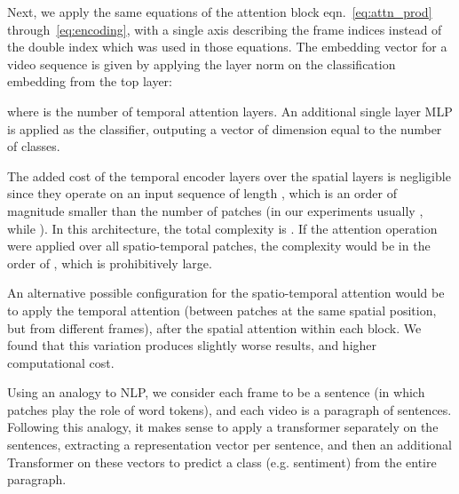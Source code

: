 \documentclass[10pt,twocolumn,letterpaper]{article}
\begin{document}
Next, we apply the same equations of the attention block eqn.~\eqref{eq:attn_prod} through~\eqref{eq:encoding}, with a single axis describing the frame indices instead of the double  index which was used in those equations. The embedding vector for a video sequence is given by applying the layer norm on the classification embedding from the top layer: 
\vspace{-0.3cm}

where  is the number of temporal attention layers.
An additional single layer MLP is applied as the classifier, outputing a vector of dimension equal to the number of classes.


The added cost of the temporal encoder layers over the spatial layers is negligible since they operate on an input sequence of length , which is an order of magnitude smaller than the number of patches  (in our experiments usually , while ).  In this architecture, the total complexity is .  If the attention operation were applied over all spatio-temporal patches, the complexity would be in the order of , which is prohibitively large.


An alternative possible configuration for the spatio-temporal attention would be to apply the temporal attention (between patches at the same spatial position, but from different frames), after the spatial attention within each block. We found that this variation produces slightly worse results, and higher computational cost. 

Using an analogy to NLP, we consider each frame to be a sentence (in which patches play the role of word tokens), and each video is a paragraph of sentences. Following this analogy, it makes sense to apply a transformer separately on the sentences, extracting a representation vector per sentence, and then an additional Transformer on these vectors to predict a class (e.g. sentiment) from the entire paragraph.







%
 
\end{document}
